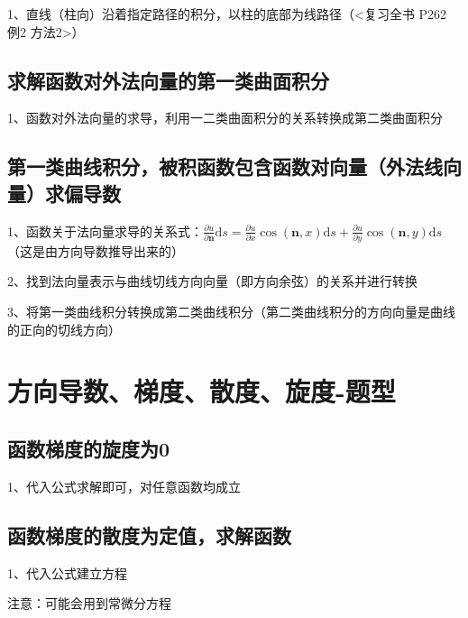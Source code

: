 1、直线（柱向）沿着指定路径的积分，以柱的底部为线路径（<复习全书 P262 例2 方法2>）



\subsection{求解函数对外法向量的第一类曲面积分}

1、函数对外法向量的求导，利用一二类曲面积分的关系转换成第二类曲面积分



\subsection{第一类曲线积分，被积函数包含函数对向量（外法线向量）求偏导数}

1、函数关于法向量求导的关系式：$\frac{\partial u}{\partial \boldsymbol{n}} \mathrm{d} s=\frac{\partial u}{\partial x} \cos (\boldsymbol{n}, x) \mathrm{d} s+\frac{\partial u}{\partial y} \cos (\boldsymbol{n}, y) \mathrm{d} s$（这是由方向导数推导出来的）

2、找到法向量表示与曲线切线方向向量（即方向余弦）的关系并进行转换

3、将第一类曲线积分转换成第二类曲线积分（第二类曲线积分的方向向量是曲线的正向的切线方向）

\section{方向导数、梯度、散度、旋度-题型}



\subsection{函数梯度的旋度为0}

1、代入公式求解即可，对任意函数均成立



\subsection{函数梯度的散度为定值，求解函数}

1、代入公式建立方程

注意：可能会用到常微分方程



